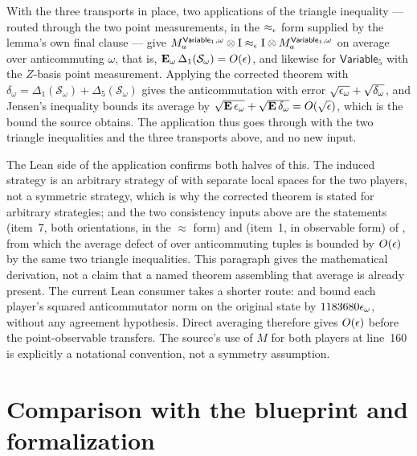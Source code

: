 \documentclass[11pt]{article}
\newcommand{\strategy}{\mathcal{S}}
\newcommand{\Id}{\mathrm{I}}
\newcommand{\Variable}{\mathsf{Variable}}
\begin{document}
With the three transports in place, two applications of the triangle
inequality --- routed through the two point measurements, in the
$\approx_\epsilon$ form supplied by the lemma's own final clause --- give
$M^{\Variable_1,\omega}_a \ot \Id \approx_\eps \Id \ot M^{\Variable_1,\omega}_a$
on average over anticommuting $\omega$, that is,
$\E_\omega \Delta_1(\strategy_\omega) = O(\eps)$, and likewise for
$\Variable_5$ with the $Z$-basis point measurement.  Applying the corrected
theorem with $\delta_\omega = \Delta_1(\strategy_\omega) +
\Delta_5(\strategy_\omega)$ gives the anticommutation with error
$\sqrt{\epsilon_\omega} + \sqrt{\delta_\omega}$, and Jensen's inequality bounds its
average by $\sqrt{\mathop{\bf E\/}\epsilon_\omega} + \sqrt{\mathop{\bf E\/}\delta_\omega} = O(\sqrt{\epsilon})$,
which is the bound the source obtains.  The application thus goes through with
the two triangle inequalities and the three transports above, and no new
input.

The Lean side of the application confirms both halves of this.  The induced
strategy  is an
arbitrary strategy of  with separate local
spaces for the two players, not a symmetric strategy, which is why the
corrected theorem is stated for arbitrary strategies; and the two consistency
inputs above are the statements
 (item~7, both orientations, in
the $\approx$ form) and 
(item~1, in observable form) of
, from which the
average defect of  over
anticommuting tuples is bounded by $O(\epsilon)$ by the same two triangle
inequalities. This paragraph gives the mathematical derivation, not a claim
that a named theorem assembling that average is already present. The current
Lean consumer takes a shorter route:
and 
bound each player's squared anticommutator norm on the original state by
$1183680\epsilon_\omega$, without any agreement hypothesis. Direct averaging
therefore gives $O(\epsilon)$ before the point-observable transfers. The source's
use of $M$ for both players at line~160 is explicitly a notational convention,
not a symmetry assumption.

\section{Comparison with the blueprint and formalization}
\label{sec:formal}
\end{document}
